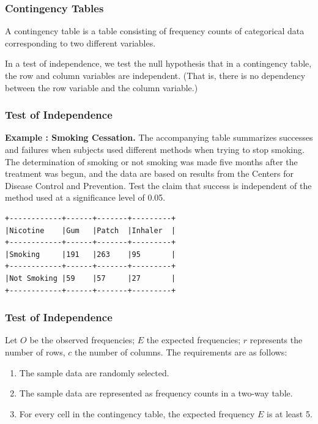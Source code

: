 \documentclass[xcolor=dvipsnames]{beamer}
\newcounter{expls}
\newcommand{\beispiel}[1]{\refstepcounter{expls}\textbf{Example \arabic{expls}: #1.}}
\begin{document}
\begin{frame}
  \frametitle{Contingency Tables}
  A \alert{contingency table} is a table consisting of frequency
  counts of categorical data corresponding to two different
  variables.

  \bigskip

  In a \alert{test of independence}, we test the null hypothesis
  that in a contingency table, the row and column variables are
  independent. (That is, there is no dependency between the row
  variable and the column variable.)
\end{frame}

\begin{frame}[fragile]
  \frametitle{Test of Independence}
  \beispiel{Smoking Cessation} The accompanying table summarizes
  successes and failures when subjects used different methods
  when trying to stop smoking. The determination of smoking or not
  smoking was made five months after the treatment was begun, and
  the data are based on results from the Centers for Disease
  Control and Prevention. Test the claim that success is
  independent of the method used at a significance level of 0.05.
\begin{verbatim}
+------------+------+-------+---------+
|Nicotine    |Gum   |Patch  |Inhaler  |
+------------+------+-------+---------+
|Smoking     |191   |263    |95       |
+------------+------+-------+---------+
|Not Smoking |59    |57     |27       |
+------------+------+-------+---------+
\end{verbatim}
\end{frame}

\begin{frame}
  \frametitle{Test of Independence}
  Let $O$ be the observed frequencies; $E$ the expected
  frequencies; $r$ represents the number of rows, $c$ the number
  of columns. The requirements are as follows:
  \begin{enumerate}
  \item The sample data are randomly selected.
  \item The sample data are represented as frequency counts in a
    two-way table.
  \item For every cell in the contingency table, the expected
    frequency $E$ is at least 5.
  \end{enumerate}
\end{frame}
\end{document}
